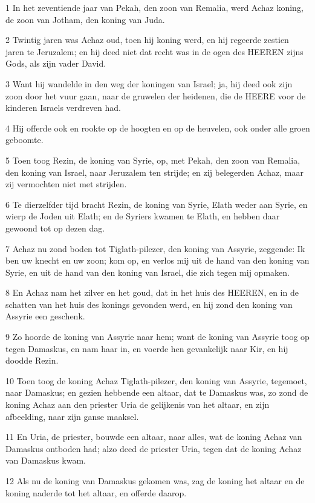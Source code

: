 \par 1 In het zeventiende jaar van Pekah, den zoon van Remalia, werd Achaz koning, de zoon van Jotham, den koning van Juda.
\par 2 Twintig jaren was Achaz oud, toen hij koning werd, en hij regeerde zestien jaren te Jeruzalem; en hij deed niet dat recht was in de ogen des HEEREN zijns Gods, als zijn vader David.
\par 3 Want hij wandelde in den weg der koningen van Israel; ja, hij deed ook zijn zoon door het vuur gaan, naar de gruwelen der heidenen, die de HEERE voor de kinderen Israels verdreven had.
\par 4 Hij offerde ook en rookte op de hoogten en op de heuvelen, ook onder alle groen geboomte.
\par 5 Toen toog Rezin, de koning van Syrie, op, met Pekah, den zoon van Remalia, den koning van Israel, naar Jeruzalem ten strijde; en zij belegerden Achaz, maar zij vermochten niet met strijden.
\par 6 Te dierzelfder tijd bracht Rezin, de koning van Syrie, Elath weder aan Syrie, en wierp de Joden uit Elath; en de Syriers kwamen te Elath, en hebben daar gewoond tot op dezen dag.
\par 7 Achaz nu zond boden tot Tiglath-pilezer, den koning van Assyrie, zeggende: Ik ben uw knecht en uw zoon; kom op, en verlos mij uit de hand van den koning van Syrie, en uit de hand van den koning van Israel, die zich tegen mij opmaken.
\par 8 En Achaz nam het zilver en het goud, dat in het huis des HEEREN, en in de schatten van het huis des konings gevonden werd, en hij zond den koning van Assyrie een geschenk.
\par 9 Zo hoorde de koning van Assyrie naar hem; want de koning van Assyrie toog op tegen Damaskus, en nam haar in, en voerde hen gevankelijk naar Kir, en hij doodde Rezin.
\par 10 Toen toog de koning Achaz Tiglath-pilezer, den koning van Assyrie, tegemoet, naar Damaskus; en gezien hebbende een altaar, dat te Damaskus was, zo zond de koning Achaz aan den priester Uria de gelijkenis van het altaar, en zijn afbeelding, naar zijn ganse maaksel.
\par 11 En Uria, de priester, bouwde een altaar, naar alles, wat de koning Achaz van Damaskus ontboden had; alzo deed de priester Uria, tegen dat de koning Achaz van Damaskus kwam.
\par 12 Als nu de koning van Damaskus gekomen was, zag de koning het altaar en de koning naderde tot het altaar, en offerde daarop.
